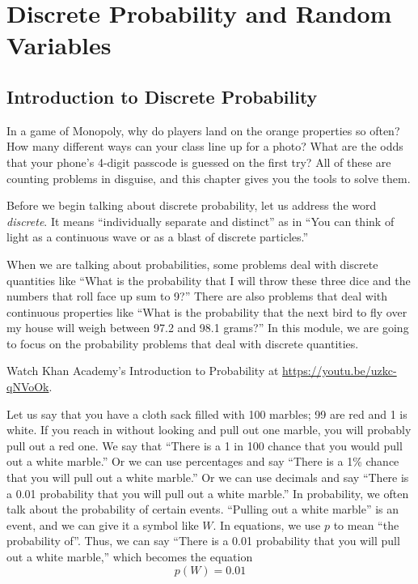 \chapter{Discrete Probability and Random Variables}


\section{Introduction to Discrete Probability}
In a game of Monopoly, why do players land on the orange properties so
often? How many different ways can your class line up for a photo? What
are the odds that your phone's 4-digit passcode is guessed on the first
try? All of these are counting problems in disguise, and this chapter
gives you the tools to solve them.

Before we begin talking about discrete probability, let us address the word \emph{discrete}. It means ``individually
separate and distinct'' as in ``You can think of light as a
continuous wave or as a blast of discrete particles.''

When we are talking about probabilities, some problems deal
with discrete quantities like ``What is the probability that I will
throw these three dice and the numbers that roll face up sum to 9?'' There
are also problems that deal with continuous properties like ``What is
the probability that the next bird to fly over my house will weigh
between 97.2 and 98.1 grams?'' In this module, we are going to focus
on the probability problems that deal with discrete quantities.

Watch Khan Academy's Introduction to Probability at \url{https://youtu.be/uzkc-qNVoOk}.

Let us say that you have a cloth sack filled with 100 marbles; 99 are red
and 1 is white. If you reach in without looking and pull out
one marble, you will probably pull out a red one. We say that ``There
is a 1 in 100 chance that you would pull out a white marble.'' Or we
can use percentages and say ``There is a 1\% chance that you will pull
out a white marble.'' Or we can use decimals and say ``There is a 0.01
probability that you will pull out a white marble.''
In probability, we often talk about the probability of certain
events. ``Pulling out a white marble'' is an event, and we can give it
a symbol like $W$. In equations, we use $p$ to mean ``the
probability of''. Thus, we can say ``There is a 0.01 probability that
you will pull out a white marble,'' which becomes the equation
\begin{equation*}
  p(W) = 0.01
\end{equation*}

